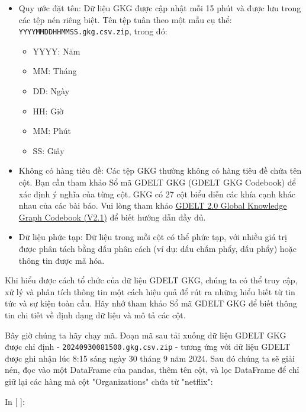 \begin{itemize}
\item
  Quy ước đặt tên: Dữ liệu GKG được cập nhật mỗi 15 phút và được lưu trong các tệp nén riêng biệt. Tên tệp tuân theo một mẫu cụ thể: \texttt{YYYYMMDDHHMMSS.gkg.csv.zip}, trong đó:

  \begin{itemize}
    \item
    YYYY: Năm
  \item
    MM: Tháng
  \item
    DD: Ngày
  \item
    HH: Giờ
  \item
    MM: Phút
  \item
    SS: Giây
  \end{itemize}
\item
  Không có hàng tiêu đề: Các tệp GKG thường không có hàng tiêu đề chứa tên cột. Bạn cần tham khảo Sổ mã GDELT GKG (GDELT GKG Codebook) để xác định ý nghĩa của từng cột. GKG có 27 cột biểu diễn các khía cạnh khác nhau của các bài báo. Vui lòng tham khảo \href{http://data.gdeltproject.org/documentation/GDELT-Global_Knowledge_Graph_Codebook-V2.1.pdf}{GDELT 2.0 Global Knowledge Graph Codebook (V2.1)} để biết hướng dẫn đầy đủ.
\item
  Dữ liệu phức tạp: Dữ liệu trong mỗi cột có thể phức tạp, với nhiều giá trị được phân tách bằng dấu phân cách (ví dụ: dấu chấm phẩy, dấu phẩy) hoặc thông tin được mã hóa.
\end{itemize}

Khi hiểu được cách tổ chức của dữ liệu GDELT GKG, chúng ta có thể truy cập, xử lý và phân tích thông tin một cách hiệu quả để rút ra những hiểu biết từ tin tức và sự kiện toàn cầu. Hãy nhớ tham khảo Sổ mã GDELT GKG để biết thông tin chi tiết về định dạng dữ liệu và mô tả các cột.

Bây giờ chúng ta hãy chạy mã. Đoạn mã sau tải xuống dữ liệu GDELT GKG được chỉ định - \texttt{20240930081500.gkg.csv.zip} - tương ứng với dữ liệu GDELT được ghi nhận lúc 8:15 sáng ngày 30 tháng 9 năm 2024. Sau đó chúng ta sẽ giải nén, đọc vào một DataFrame của pandas, thêm tên cột, và lọc DataFrame để chỉ giữ lại các hàng mà cột "Organizations" chứa từ "netflix":

In {[} {]}:

